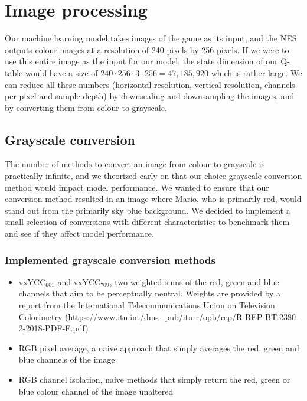 \section{Image processing}

Our machine learning model takes images of the game as its input, and the NES outputs colour images at a resolution of 240 pixels by 256 pixels. If we were to use this entire image as the input for our model, the state dimension of our Q-table would have a size of $240 \cdot 256 \cdot 3 \cdot 256 = 47,185,920$ which is rather large. We can reduce all these numbers (horizontal resolution, vertical resolution, channels per pixel and sample depth) by downscaling and downsampling the images, and by converting them from colour to grayscale.

\subsection{Grayscale conversion}

The number of methods to convert an image from colour to grayscale is practically infinite, and we theorized early on that our choice grayscale conversion method would impact model performance. We wanted to ensure that our conversion method resulted in an image where Mario, who is primarily red, would stand out from the primarily sky blue background. We decided to implement a small selection of conversions with different characteristics to benchmark them and see if they affect model performance.

\subsubsection*{Implemented grayscale conversion methods}

\begin{itemize}
    \item vxYCC$_{601}$ and vxYCC$_{709}$, two weighted sums of the red, green and blue channels that aim to be perceptually neutral. Weights are provided by a report from the International Telecommunications Union on Television Colorimetry (https://www.itu.int/dms\_pub/itu-r/opb/rep/R-REP-BT.2380-2-2018-PDF-E.pdf)
    \item RGB pixel average, a naive approach that simply averages the red, green and blue channels of the image
    \item RGB channel isolation, naive methods that simply return the red, green or blue colour channel of the image unaltered
\end{itemize}

